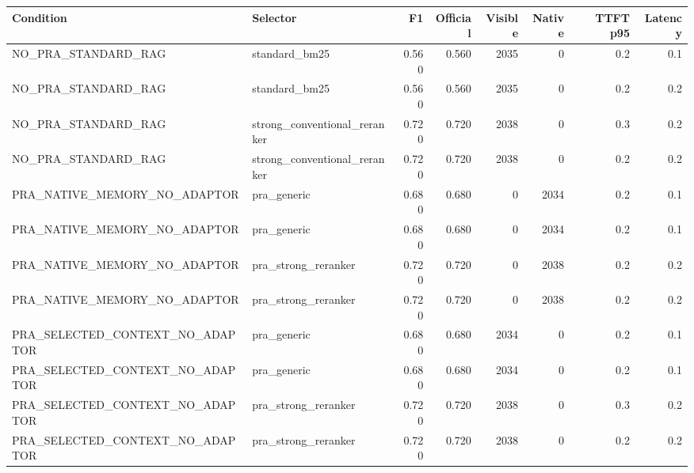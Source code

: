\begin{tabular}{llrrrrrr}
\toprule
Condition & Selector & F1 & Official & Visible & Native & TTFT p95 & Latency \\
\midrule
NO\_PRA\_STANDARD\_RAG & standard\_bm25 & 0.560 & 0.560 & 2035 & 0 & 0.2 & 0.1 \\
NO\_PRA\_STANDARD\_RAG & standard\_bm25 & 0.560 & 0.560 & 2035 & 0 & 0.2 & 0.2 \\
NO\_PRA\_STANDARD\_RAG & strong\_conventional\_reranker & 0.720 & 0.720 & 2038 & 0 & 0.3 & 0.2 \\
NO\_PRA\_STANDARD\_RAG & strong\_conventional\_reranker & 0.720 & 0.720 & 2038 & 0 & 0.2 & 0.2 \\
PRA\_NATIVE\_MEMORY\_NO\_ADAPTOR & pra\_generic & 0.680 & 0.680 & 0 & 2034 & 0.2 & 0.1 \\
PRA\_NATIVE\_MEMORY\_NO\_ADAPTOR & pra\_generic & 0.680 & 0.680 & 0 & 2034 & 0.2 & 0.1 \\
PRA\_NATIVE\_MEMORY\_NO\_ADAPTOR & pra\_strong\_reranker & 0.720 & 0.720 & 0 & 2038 & 0.2 & 0.2 \\
PRA\_NATIVE\_MEMORY\_NO\_ADAPTOR & pra\_strong\_reranker & 0.720 & 0.720 & 0 & 2038 & 0.2 & 0.2 \\
PRA\_SELECTED\_CONTEXT\_NO\_ADAPTOR & pra\_generic & 0.680 & 0.680 & 2034 & 0 & 0.2 & 0.1 \\
PRA\_SELECTED\_CONTEXT\_NO\_ADAPTOR & pra\_generic & 0.680 & 0.680 & 2034 & 0 & 0.2 & 0.1 \\
PRA\_SELECTED\_CONTEXT\_NO\_ADAPTOR & pra\_strong\_reranker & 0.720 & 0.720 & 2038 & 0 & 0.3 & 0.2 \\
PRA\_SELECTED\_CONTEXT\_NO\_ADAPTOR & pra\_strong\_reranker & 0.720 & 0.720 & 2038 & 0 & 0.2 & 0.2 \\
\bottomrule
\end{tabular}
